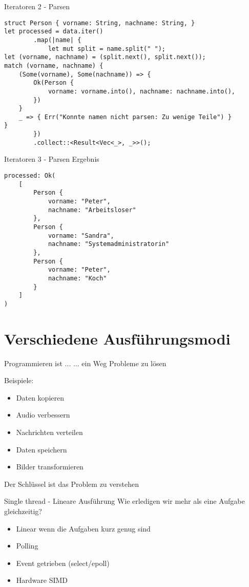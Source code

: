 \documentclass[aspectratio=1610,t]{beamer}
\begin{document}
\begin{frame}[fragile]{Iteratoren 2 - Parsen}
\begin{verbatim}
struct Person { vorname: String, nachname: String, }
let processed = data.iter()
        .map(|name| {
            let mut split = name.split(" ");
let (vorname, nachname) = (split.next(), split.next());
match (vorname, nachname) {
    (Some(vorname), Some(nachname)) => {
        Ok(Person {
            vorname: vorname.into(), nachname: nachname.into(),
        })
    }
    _ => { Err("Konnte namen nicht parsen: Zu wenige Teile") }
}
        })
        .collect::<Result<Vec<_>, _>>();
\end{verbatim}
\end{frame}



\begin{frame}[fragile]{Iteratoren 3 - Parsen Ergebnis}
\begin{verbatim}
processed: Ok(
    [
        Person {
            vorname: "Peter",
            nachname: "Arbeitsloser"
        },
        Person {
            vorname: "Sandra",
            nachname: "Systemadministratorin"
        },
        Person {
            vorname: "Peter",
            nachname: "Koch"
        }
    ]
)
\end{verbatim}
\end{frame}



{
\section{Verschiedene Ausführungsmodi}
}

\begin{frame}[fragile]{Programmieren ist ...}
... ein Weg Probleme zu lösen

Beispiele:
\begin{itemize}
  \item Daten kopieren
  \item Audio verbessern
  \item Nachrichten verteilen
  \item Daten speichern
  \item Bilder transformieren
\end{itemize}

Der Schlüssel ist das Problem zu verstehen
\end{frame}

\begin{frame}[fragile]{Single thread - Lineare Ausführung}
Wie erledigen wir mehr als eine Aufgabe gleichzeitig?

\begin{itemize}
  \item Linear wenn die Aufgaben kurz genug sind
  \item Polling
  \item Event getrieben (select/epoll)
  \item Hardware SIMD
\end{itemize}
\end{frame}
\end{document}
